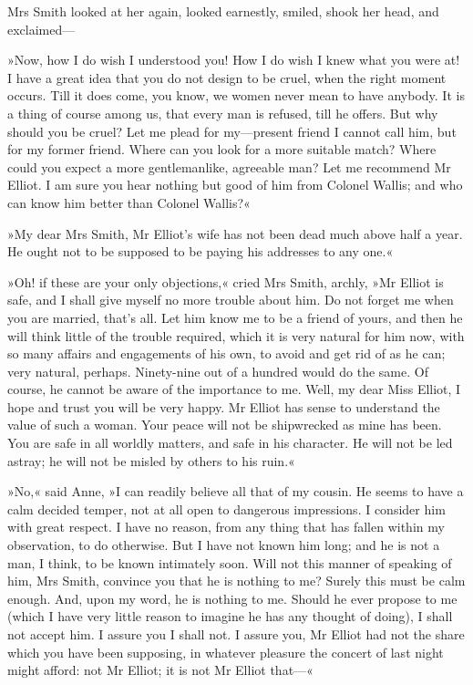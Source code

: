 Mrs Smith looked at her again, looked earnestly, smiled, shook her head, and exclaimed—

»Now, how I do wish I understood you! How I do wish I knew what you were at! I have a great idea that you do not design to be cruel, when the right moment occurs. Till it does come, you know, we women never mean to have anybody. It is a thing of course among us, that every man is refused, till he offers. But why should you be cruel? Let me plead for my—present friend I cannot call him, but for my former friend. Where can you look for a more suitable match? Where could you expect a more gentlemanlike, agreeable man? Let me recommend Mr Elliot. I am sure you hear nothing but good of him from Colonel Wallis; and who can know him better than Colonel Wallis?«

»My dear Mrs Smith, Mr Elliot's wife has not been dead much above half a year. He ought not to be supposed to be paying his addresses to any one.«

»Oh! if these are your only objections,« cried Mrs Smith, archly, »Mr Elliot is safe, and I shall give myself no more trouble about him. Do not forget me when you are married, that's all. Let him know me to be a friend of yours, and then he will think little of the trouble required, which it is very natural for him now, with so many affairs and engagements of his own, to avoid and get rid of as he can; very natural, perhaps. Ninety-nine out of a hundred would do the same. Of course, he cannot be aware of the importance to me. Well, my dear Miss Elliot, I hope and trust you will be very happy. Mr Elliot has sense to understand the value of such a woman. Your peace will not be shipwrecked as mine has been. You are safe in all worldly matters, and safe in his character. He will not be led astray; he will not be misled by others to his ruin.«

»No,« said Anne, »I can readily believe all that of my cousin. He seems to have a calm decided temper, not at all open to dangerous impressions. I consider him with great respect. I have no reason, from any thing that has fallen within my observation, to do otherwise. But I have not known him long; and he is not a man, I think, to be known intimately soon. Will not this manner of speaking of him, Mrs Smith, convince you that he is nothing to me? Surely this must be calm enough. And, upon my word, he is nothing to me. Should he ever propose to me (which I have very little reason to imagine he has any thought of doing), I shall not accept him. I assure you I shall not. I assure you, Mr Elliot had not the share which you have been supposing, in whatever pleasure the concert of last night might afford: not Mr Elliot; it is not Mr Elliot that—«


